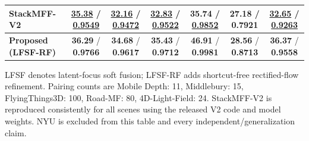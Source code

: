 \begin{table}[t]
{\begin{tabular}{@{}lcccccc@{}}
StackMFF-V2 & \underline{35.38} / \underline{0.9549} & \underline{32.16} / \underline{0.9472} & \underline{32.83} / \underline{0.9522} & 35.74 / \underline{0.9852} & 27.18 / 0.7921 & \underline{32.65} / \underline{0.9263} \\
\midrule
\textbf{Proposed (LFSF-RF)} & \textbf{36.29} / \textbf{0.9766} & \textbf{34.68} / \textbf{0.9617} & \textbf{35.43} / \textbf{0.9712} & \textbf{46.91} / \textbf{0.9981} & \textbf{28.56} / \textbf{0.8713} & \textbf{36.37} / \textbf{0.9558} \\
\bottomrule
\end{tabular}}
\vspace{2pt}
\footnotesize{LFSF denotes latent-focus soft fusion; LFSF-RF adds shortcut-free rectified-flow refinement. Pairing counts are Mobile Depth: 11, Middlebury: 15, FlyingThings3D: 100, Road-MF: 80, 4D-Light-Field: 24. StackMFF-V2 is reproduced consistently for all scenes using the released V2 code and model weights. NYU is excluded from this table and every independent/generalization claim.}
\end{table}
